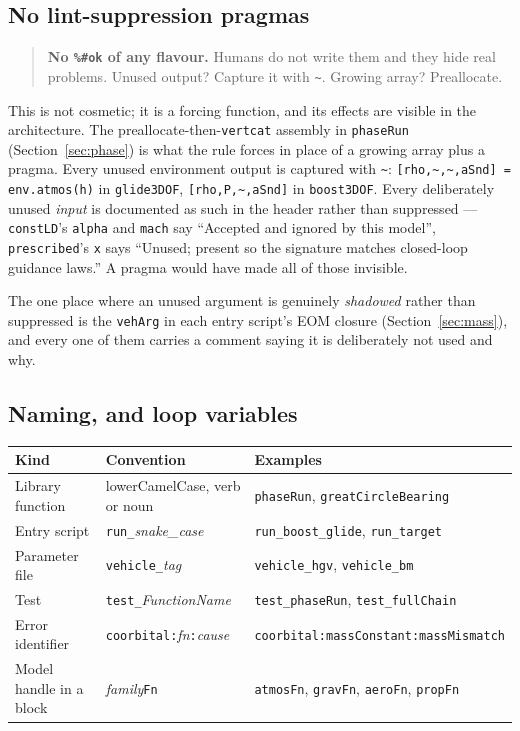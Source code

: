 \documentclass[11pt]{article}
\newcommand{\code}[1]{\texttt{#1}}
\begin{document}
\subsection{No lint-suppression pragmas}

\begin{quote}
\textbf{No \code{\%\#ok} of any flavour.} Humans do not write them and they
hide real problems. Unused output? Capture it with \code{\textasciitilde}.
Growing array? Preallocate.
\end{quote}

This is not cosmetic; it is a forcing function, and its effects are visible in
the architecture. The preallocate-then-\code{vertcat} assembly in
\code{phaseRun} (Section~\ref{sec:phase}) is what the rule forces in place of a
growing array plus a pragma. Every unused environment output is captured with
\code{\textasciitilde}: \code{[rho,\textasciitilde,\textasciitilde,aSnd] = env.atmos(h)}
in \code{glide3DOF}, \code{[rho,P,\textasciitilde,aSnd]} in \code{boost3DOF}.
Every deliberately unused \emph{input} is documented as such in the header
rather than suppressed --- \code{constLD}'s \code{alpha} and \code{mach} say
``Accepted and ignored by this model'', \code{prescribed}'s \code{x} says
``Unused; present so the signature matches closed-loop guidance laws.'' A
pragma would have made all of those invisible.

The one place where an unused argument is genuinely \emph{shadowed} rather than
suppressed is the \code{vehArg} in each entry script's EOM closure
(Section~\ref{sec:mass}), and every one of them carries a comment saying it is
deliberately not used and why.

\subsection{Naming, and loop variables}

\begin{center}
\begin{tabular}{lll}
\toprule
Kind & Convention & Examples \\
\midrule
Library function & lowerCamelCase, verb or noun & \code{phaseRun}, \code{greatCircleBearing} \\
Entry script     & \code{run\_}\emph{snake\_case} & \code{run\_boost\_glide}, \code{run\_target} \\
Parameter file   & \code{vehicle\_}\emph{tag}    & \code{vehicle\_hgv}, \code{vehicle\_bm} \\
Test             & \code{test\_}\emph{FunctionName} & \code{test\_phaseRun}, \code{test\_fullChain} \\
Error identifier & \code{coorbital:}\emph{fn}\code{:}\emph{cause} & \code{coorbital:massConstant:massMismatch} \\
Model handle in a block & \emph{family}\code{Fn}   & \code{atmosFn}, \code{gravFn}, \code{aeroFn}, \code{propFn} \\
\bottomrule
\end{tabular}
\end{center}
\end{document}
